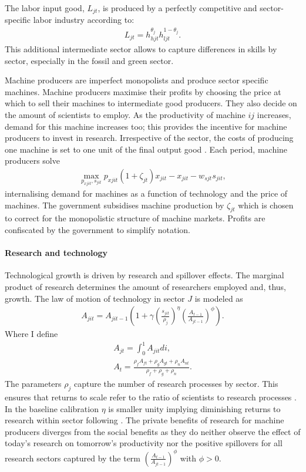 The labor input good, $L_{jt}$, is produced by a perfectly competitive and sector-specific labor industry according to: 
\begin{align}
L_{jt}=h_{hjt}^{\theta_j}h_{ljt}^{1-\theta_j}.
\end{align}
This additional intermediate sector allows to capture differences in skills by sector, especially in the fossil and green sector.

Machine producers are imperfect monopolists and produce sector specific machines. Machine producers maximise their profits by choosing the price at which to sell their machines to intermediate good producers. They also decide on the amount of scientists to employ. As the productivity of machine $ij$ increases, demand for this machine increases too; this provides the incentive for machine producers to invest in research. Irrespective of the sector, the costs of producing one machine is set to one unit of the final output good \citep[similar to][]{Fried2018ClimateAnalysis, Acemoglu2012TheChange}.
Each period, machine producers solve
\begin{align}
\underset{p_{xjit}, s_{jit}}{\max}p_{xjit}(1+\zeta_{jt})x_{jit}-x_{jit}-w_{sjt}s_{jit},
\end{align}
internalising demand for machines as a function of technology and the price of machines. 
The government subsidises machine production by $\zeta_{jt}$ which is chosen to correct for the monopolistic structure of machine markets. Profits are confiscated by the government to simplify notation.

\paragraph{Research and technology}
Technological growth is driven by research and spillover effects. The marginal product of research determines the amount of researchers employed and, thus, growth. 
The law of motion of technology in sector $J$ is modeled as
\begin{align}
A_{jit}=A_{jit-1}\left(1+\gamma\left(\frac{s_{jit}}{\rho_j}\right)^\eta\left(\frac{A_{t-1}}{A_{jt-1}}\right)^\phi\right).
\end{align}
Where I define
\begin{align}
A_{jt}=\int_{0}^{1}A_{jit}di,\\
A_{t}=\frac{\rho_fA_{ft}+\rho_gA_{gt}+\rho_n A_{nt}}{\rho_f+\rho_g+\rho_n}.
\end{align}
The parameters $\rho_j$ capture the number of research processes by sector. This ensures that returns to scale refer to the ratio of scientists to research processes \citep{Fried2018ClimateAnalysis}. In the baseline calibration $\eta$ is smaller unity implying diminishing returns to research within sector following \cite{Fried2018ClimateAnalysis}. 
The private benefits of research for machine producers diverges from the social benefits as they do neither observe the effect of today's research on tomorrow's productivity nor the positive spillovers for all research sectors captured by the term $\left(\frac{A_{t-1}}{A_{jt-1}}\right)^\phi$ with $\phi>0$. 

